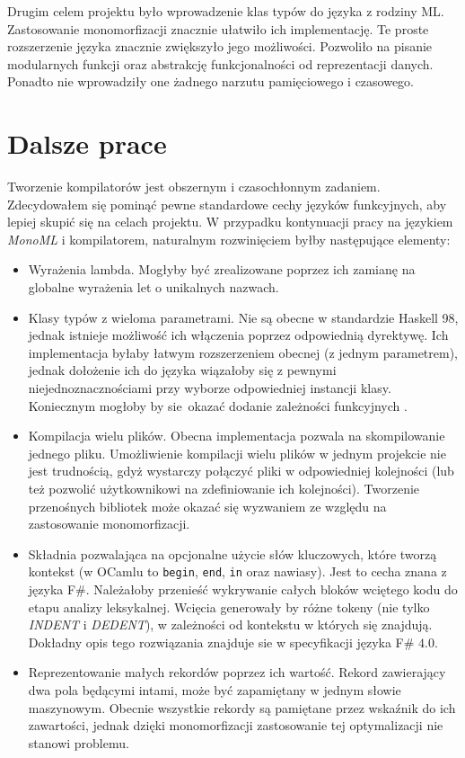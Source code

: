 \documentclass[declaration,shortabstract]{iithesis}
\begin{document}
Drugim celem projektu było wprowadzenie klas typów do języka z rodziny ML. 
Zastosowanie monomorfizacji znacznie ułatwiło ich implementację. Te proste
rozszerzenie języka znacznie zwiększyło jego możliwości. Pozwoliło na 
pisanie modularnych funkcji oraz abstrakcję funkcjonalności od reprezentacji 
danych. Ponadto nie wprowadziły one żadnego narzutu pamięciowego i czasowego.

\section{Dalsze prace}

Tworzenie kompilatorów jest obszernym i czasochłonnym zadaniem. Zdecydowałem 
się pominąć pewne standardowe cechy języków funkcyjnych, aby lepiej skupić 
się na celach projektu. W przypadku kontynuacji pracy na językiem \textit{MonoML}
i kompilatorem, naturalnym rozwinięciem byłby następujące elementy:

\begin{itemize}
  \item Wyrażenia lambda. Mogłyby być zrealizowane poprzez ich zamianę na 
  globalne wyrażenia let o unikalnych nazwach. 
  \item Klasy typów z wieloma parametrami. Nie są obecne w standardzie 
  Haskell 98, jednak istnieje możliwość ich włączenia poprzez odpowiednią 
  dyrektywę. Ich implementacja byłaby łatwym 
  rozszerzeniem obecnej (z jednym parametrem), jednak dołożenie ich do języka 
  wiązałoby się z pewnymi niejednoznacznościami \cite{multi_params_tcs}
  przy wyborze odpowiedniej instancji klasy. Koniecznym mogłoby by sie okazać 
  dodanie zależności funkcyjnych \cite{fun_deps}.
  \item Kompilacja wielu plików. Obecna implementacja pozwala na skompilowanie 
  jednego pliku. Umożliwienie kompilacji wielu plików w jednym projekcie nie 
  jest trudnością, gdyż wystarczy połączyć pliki w odpowiedniej kolejności 
  (lub też pozwolić użytkownikowi na zdefiniowanie ich kolejności). Tworzenie 
  przenośnych bibliotek może okazać się wyzwaniem ze względu na zastosowanie 
  monomorfizacji.
  \item Składnia pozwalająca na opcjonalne użycie słów kluczowych, które tworzą 
  kontekst (w OCamlu to \texttt{begin}, \texttt{end}, \texttt{in} oraz nawiasy).
  Jest to cecha znana z języka F\#. Należałoby przenieść wykrywanie 
  całych bloków wciętego kodu do etapu analizy leksykalnej. Wcięcia generowały 
  by różne tokeny (nie tylko \textit{INDENT} i \textit{DEDENT}), w zależności 
  od kontekstu w których się znajdują. Dokładny opis tego rozwiązania znajduje 
  sie w specyfikacji języka F\# $4.0$\cite{fs_spec}.
  \item Reprezentowanie małych rekordów poprzez ich wartość. Rekord zawierający 
  dwa pola będącymi intami, może być zapamiętany w jednym słowie maszynowym. 
  Obecnie wszystkie rekordy są pamiętane przez wskaźnik do ich zawartości, 
  jednak dzięki monomorfizacji zastosowanie tej optymalizacji nie stanowi 
  problemu.

\end{itemize}
\end{document}
